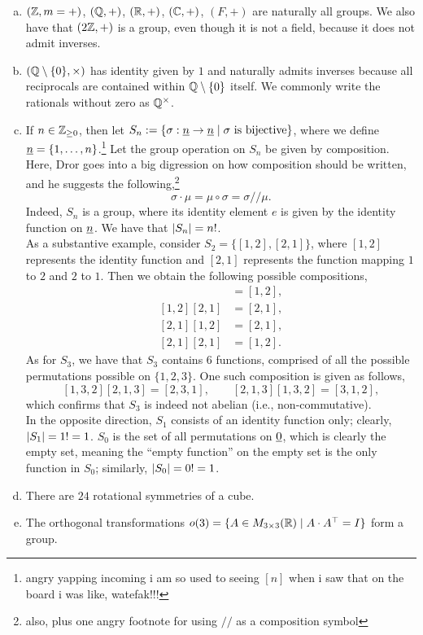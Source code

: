 \begin{enumerate}[(a)]
    \item $(\mathbb Z, m = +)$, $(\mathbb Q, +)$, $(\mathbb R, +)$, $(\mathbb C, +)$, $(F, +)$ are naturally all groups. We also have that $(2 \mathbb Z, +)$ is a group, even though it is not a field, because it does not admit inverses.
    \item $(\mathbb Q \setminus \{0\}, \times)$ has identity given by $1$ and naturally admits inverses because all reciprocals are contained within $\mathbb Q \setminus \{0\}$ itself. We commonly write the rationals without zero as $\mathbb Q^\times$.
    \item If $n \in \mathbb Z_{\geq 0}$, then let $S_n := \{\sigma : \underline{n} \to \underline{n} \mid \sigma \text{ is bijective} \}$, where we define $\underline{n} = \{1, \dots, n\}$.\footnote{angry yapping incoming i am so used to seeing $[n]$ when i saw that on the board i was like, watefak!!!} Let the group operation on $S_n$ be given by composition. Here, Dror goes into a big digression on how composition should be written, and he suggests the following,\footnote{also, plus one angry footnote for using $/\!\!/$ as a composition symbol}
    \[ \sigma \cdot \mu = \mu \circ \sigma = \sigma /\!\!/ \mu. \]
    Indeed, $S_n$ is a group, where its identity element $e$ is given by the identity function on $\underline{n}$. We have that $\left\lvert S_n \right\rvert = n!$.
    \\[8pt]
    As a substantive example, consider $S_2 = \{[1, 2], [2, 1]\}$, where $[1, 2]$ represents the identity function and $[2, 1]$ represents the function mapping $1$ to $2$ and $2$ to $1$. Then we obtain the following possible compositions,
    \begin{align*}
        [1, 2] [1, 2] &= [1, 2], \\
        [1, 2] [2, 1] &= [2, 1], \\
        [2, 1] [1, 2] &= [2, 1], \\
        [2, 1] [2, 1] &= [1, 2].
    \end{align*}
    As for $S_3$, we have that $S_3$ contains $6$ functions, comprised of all the possible permutations possible on $\{1, 2, 3\}$. One such composition is given as follows,
    \[ [1, 3, 2] [2, 1, 3] = [2, 3, 1], \qquad [2, 1, 3] [1, 3, 2] = [3, 1, 2], \]
    which confirms that $S_3$ is indeed not abelian (i.e., non-commutative).
    \\[8pt]
    In the opposite direction, $S_1$ consists of an identity function only; clearly, $\left\lvert S_1 \right\rvert = 1! = 1$. $S_0$ is the set of all permutations on $\underline{0}$, which is clearly the empty set, meaning the ``empty function'' on the empty set is the only function in $S_0$; similarly, $\left\lvert S_0 \right\rvert = 0! = 1$.
    \item There are $24$ rotational symmetries of a cube.
    \item The orthogonal transformations $o(3) = \{A \in M_{3 \times 3}(\mathbb R) \mid A \cdot A^\top = I\}$ form a group.
\end{enumerate}
